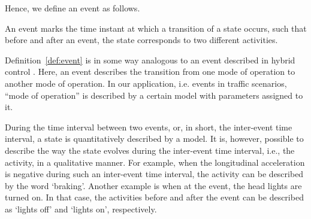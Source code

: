 Hence, we define an event as follows.
\begin{definition}[Event] \label{def:event}
	An event marks the time instant at which a transition of a state occurs, such that before and after an event, the state corresponds to two different activities.  %
\end{definition}

Definition~\ref{def:event} is in some way analogous to an event described in hybrid control \cite{boel1999hybridcontrol}. Here, an event describes the transition from one mode of operation to another mode of operation. In our application, i.e. events in traffic scenarios, ``mode of operation'' is described by a certain model with parameters assigned to it.

During the time interval between two events, or, in short, the inter-event time interval, a state is quantitatively described by a model. It is, however, possible to describe the way the state evolves during the inter-event time interval, i.e., the activity, in a qualitative manner. For example, when the longitudinal acceleration is negative during such an inter-event time interval, the activity can be described by the word `braking'. Another example is when at the event, the head lights are turned on. In that case, the activities before and after the event can be described as `lights off' and `lights on', respectively.
